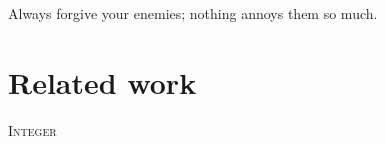
\begin{savequote}[85mm]
    {\color{stdgrey}Always forgive your enemies; nothing annoys them so much.}

\end{savequote}

\chapter{Related work}
\label{chap:2}

    \lettrine[lines=4,findent=5pt]{\textcolor{stdgrey}{I}}{nteger} 


